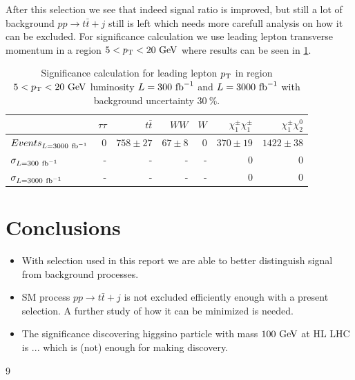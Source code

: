 \documentclass[tightenline,notitlepage,nofootinbib]{revtex4-1}
\begin{document}
After this selection we see that indeed signal ratio is improved, but still a lot of background $pp \to t \bar t + j$ still is left which needs more carefull analysis on how it can be excluded. For significance calculation we use leading lepton transverse momentum in a region $5<p_{\rm T}<20~\rm{GeV}$ where results can be seen in \cref{tab:select}.
\begin{table}[!ht]
  \setlength{\tabcolsep}{12pt}
  \centering
  \begin{tabular}{l|rrrrrr}
    & $\tau \tau$ & $t \bar t$ & $WW$ & $W$ & $\chi_1^{\pm} \chi_1^{\pm}$ &  $\chi_1^{\pm} \chi_2^0$ \\
    \hline
    $Events_{L=3000~\rm{fb}^{-1}}$  & 0 & $758 \pm 27$ & $67 \pm 8$ & 0 & $370 \pm 19$ & $1422 \pm 38$ \\
    $\sigma_{L=300~\rm{fb}^{-1}}$ & - & - & - & - & 0 & 0 \\
    $\sigma_{L=3000~\rm{fb}^{-1}}$ & - & - & - & - & 0 & 0 
  \end{tabular}
  \caption{Significance calculation for leading lepton $p_{\rm T}$ in region $5<p_{\rm T}<20~\rm{GeV}$ luminosity $L=300~\rm{fb}^{-1}$ and $L=3000~\rm{fb}^{-1}$ with background uncertainty $30~\%$.
  }
  \label{tab:select}
\end{table}

\section{Conclusions}



\begin{itemize}
\item With selection used in this report we are able to better distinguish signal from background processes.  
\item SM process $pp \to t \bar t + j$ is not excluded efficiently enough with a present selection. A further study of how it can be minimized is needed. 
\item The significance discovering higgsino particle with mass $100~\rm{GeV}$ at HL LHC is ... which is (not) enough for making discovery. 
\end{itemize}

%
{9}
%
  
\end{document}
